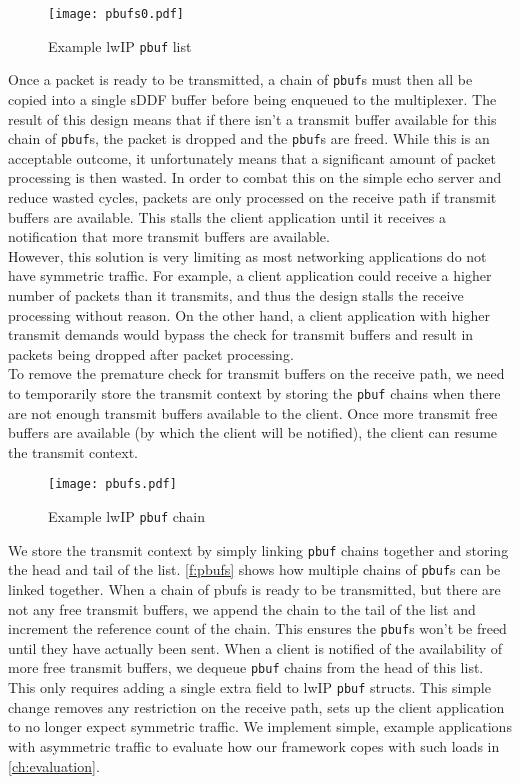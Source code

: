 \begin{figure}[h]
    \centering
    \texttt{[image: pbufs0.pdf]}
    \caption{Example lwIP \texttt{pbuf} list}
    \label{f:pbuf0s}
\end{figure}

Once a packet is ready to be transmitted,
a chain of \texttt{pbuf}s must then all be copied into a single sDDF buffer before being enqueued to the multiplexer.
The result of this design means that if there isn't a transmit buffer available for this chain of \texttt{pbuf}s, the
packet is dropped and the \texttt{pbuf}s are freed. While this is an acceptable outcome, it unfortunately means that a significant
amount of packet processing is then wasted. In order to combat this on the simple echo server and reduce
wasted cycles, packets are only
processed on the receive path if transmit buffers are available. This stalls the client application
until it receives a notification that more transmit buffers are available. \\

However, this solution is very limiting
as most networking applications do not have symmetric traffic. For example, a client application could receive a
higher number of packets than it transmits, and thus the design stalls the receive processing without reason. 
On the other hand, a client application with higher transmit demands would bypass the check for transmit buffers and result in
packets being dropped after packet processing. \\

To remove the premature check for transmit buffers on the receive path, we need to 
temporarily store the transmit context by storing the \texttt{pbuf} chains when there are not enough transmit buffers
available to the client. Once more transmit free buffers are available (by which the client will be notified),
the client can resume the transmit context. 

\begin{figure}[h]
    \centering
    \texttt{[image: pbufs.pdf]}
    \caption{Example lwIP \texttt{pbuf} chain}
    \label{f:pbufs}
\end{figure}

We store the transmit context by simply linking \texttt{pbuf} chains together and storing the head and tail of the list. 
\autoref{f:pbufs} shows how multiple chains of \texttt{pbuf}s can be linked together. When a chain of pbufs is ready to
be transmitted, but there are not any free transmit buffers, we append the chain to the tail of the list and 
increment the reference count of the chain. This ensures the \texttt{pbuf}s won't be freed until they have actually been sent.
When a client is notified of the availability of more free transmit buffers, we dequeue \texttt{pbuf} chains from the head of
this list. This only requires adding a single extra field to lwIP \texttt{pbuf} structs. This simple change removes any
restriction on the receive path, sets up the client application to no longer expect symmetric traffic. We implement simple, example
applications with asymmetric traffic to evaluate how our framework copes with such loads in \autoref{ch:evaluation}.

